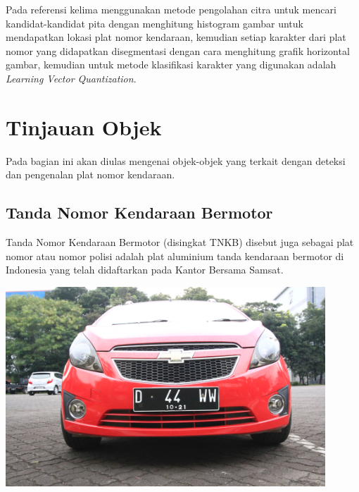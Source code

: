 \noindent Pada referensi kelima \cite{nugroho} menggunakan metode pengolahan citra untuk mencari kandidat-kandidat pita dengan menghitung histogram gambar untuk mendapatkan lokasi plat nomor kendaraan, kemudian setiap karakter dari plat nomor yang didapatkan disegmentasi dengan cara menghitung grafik horizontal gambar, kemudian untuk metode klasifikasi karakter yang digunakan adalah \textit{Learning Vector Quantization}.\\

\section{Tinjauan Objek}
\noindent Pada bagian ini akan diulas mengenai objek-objek yang terkait dengan deteksi dan pengenalan plat nomor kendaraan.\\

\subsection{Tanda Nomor Kendaraan Bermotor}
\noindent Tanda Nomor Kendaraan Bermotor (disingkat TNKB) disebut juga sebagai plat nomor atau nomor polisi adalah plat aluminium tanda kendaraan bermotor di Indonesia yang telah didaftarkan pada Kantor Bersama Samsat.

\begin{adjustbox}{width=1\textwidth}
\noindent\begin{minipage}{\linewidth}
	\centering\includegraphics[width=12cm]{images/plat_nomor_example.png}
	\label{fig:ContohPlatNomorIndonesia}
\end{minipage}
\end{adjustbox}\\

